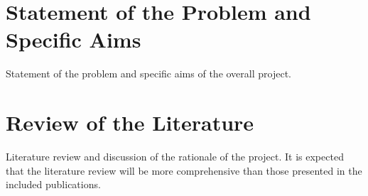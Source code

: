 \clearpage\section{Statement of the Problem and Specific Aims}\label{intro}

Statement of the problem and specific aims of the overall project.

\clearpage\section{Review of the Literature}\label{sec:pre}

Literature review and discussion of the rationale of the project.
It is expected that the literature review will be more comprehensive than
those presented in the included publications.

